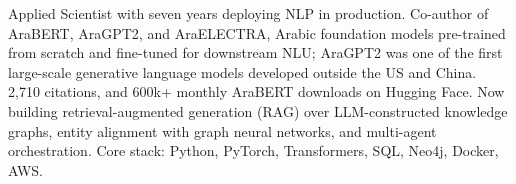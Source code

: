 

\begin{cvparagraph}

Applied Scientist with seven years deploying NLP in production. Co-author of AraBERT, AraGPT2, and AraELECTRA, Arabic foundation models \mbox{pre-trained} from scratch and \mbox{fine-tuned} for downstream NLU; AraGPT2 was one of the first \mbox{large-scale} generative language models developed outside the US and China. 2,710 citations, and 600k+ monthly AraBERT downloads on Hugging Face. Now building \mbox{retrieval-augmented} generation (RAG) over \mbox{LLM-constructed} knowledge graphs, entity alignment with graph neural networks, and \mbox{multi-agent} orchestration. Core stack: Python, PyTorch, Transformers, SQL, Neo4j, Docker, AWS.
\end{cvparagraph}
